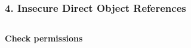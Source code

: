 \begin{frame}
\frametitle{4. Insecure Direct Object References}
\begin{columns}
\begin{column}{0.1\linewidth}\end{column}
\begin{column}{0.7\linewidth}
\Lst
\end{column}
\end{columns}
\badgoodsep
\begin{center}
{\huge\bfseries Check permissions}
\end{center}


\end{frame}
